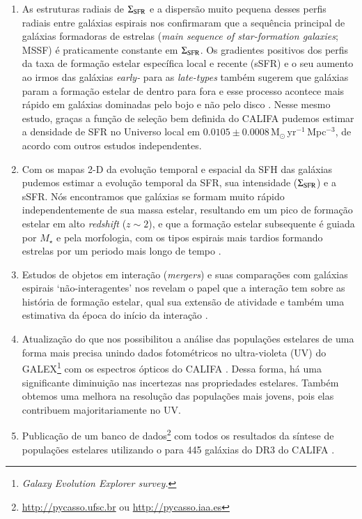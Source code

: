 \begin{enumerate}[label=(\roman*)]
  \item As estruturas radiais de $\Sigma_{\rm SFR}$ e a dispersão muito pequena desses perfis radiais entre galáxias espirais nos confirmaram que a sequência principal de galáxias formadoras de estrelas ({\em main sequence of star-formation galaxies}; MSSF) é praticamente constante em $\Sigma_{\rm SFR}$. Os gradientes positivos dos perfis da taxa de formação estelar específica local e recente (sSFR) e o seu aumento ao irmos das galáxias {\em early-} para as {\em late-types} também sugerem que galáxias param a formação estelar de dentro para fora e esse processo acontece mais rápido em galáxias dominadas pelo bojo e não pelo disco \citep{GonzalezDelgado.etal.2016a}. Nesse mesmo estudo, graças a função de seleção bem definida do CALIFA \citep{Walcher.etal.2014} pudemos estimar a densidade de SFR no Universo local em $0.0105 \pm 0.0008\,$M$_\odot\,$yr$^{-1}\,$Mpc$^{-3}$, de acordo com outros estudos independentes.
  \item Com os mapas 2-D da evolução temporal e espacial da SFH das galáxias pudemos estimar a evolução temporal da SFR, sua intensidade ($\Sigma_{\rm SFR}$) e a sSFR. Nós encontramos que galáxias se formam muito rápido independentemente de sua massa estelar, resultando em um pico de formação estelar em alto {\em redshift} ($z \sim 2$), e que a formação estelar subsequente é guiada por $M_\star$ e pela morfologia, com os tipos espirais mais tardios formando estrelas por um periodo mais longo de tempo \citep{GonzalezDelgado.etal.2017}.
  \item Estudos de objetos em interação ({\em mergers}) e suas comparações com galáxias espirais `não-interagentes' nos revelam o papel que a interação tem sobre as história de formação estelar, qual sua extensão de atividade e também uma estimativa da época do início da interação \citep{CortijoFerrero.etal.2017a, CortijoFerrero.etal.2017b, CortijoFerrero.etal.2017c}.
  \item Atualização do \starlight que nos possibilitou a análise das populações estelares de uma forma mais precisa unindo dados fotométricos no ultra-violeta (UV) do GALEX\footnote{\em Galaxy Evolution Explorer survey.} \citep{Martin.etal.2005} com os espectros ópticos do CALIFA \citep{LopezFernandez.etal.2016}. Dessa forma, há uma significante diminuição nas incertezas nas propriedades estelares. Também obtemos uma melhora na resolução das populações mais jovens, pois elas contribuem majoritariamente no UV.
  \item Publicação de um banco de dados\footnote{\href{http://pycasso.ufsc.br}{http://pycasso.ufsc.br} ou \href{http://pycasso.iaa.es}{http://pycasso.iaa.es}} com todos os resultados da síntese de populações estelares utilizando o \starlight para 445 galáxias do DR3 do CALIFA \citep{deAmorim.etal.2017}.
\end{enumerate}

